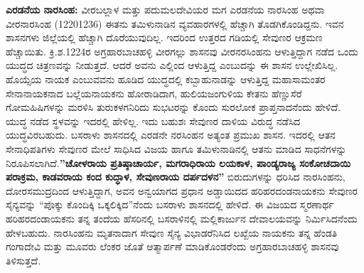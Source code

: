 \textbf{ಎರಡನೆಯ ನಾರಸಿಂಹ:} ವೀರಬಲ್ಲಾಳ ಮತ್ತು ಪದುಮಲದೇವಿಯರ ಮಗ ಎರಡನೆಯ ನಾರಸಿಂಹ ಅಥವಾ ವೀರನಾರಸಿಂಹ (1220\enginline{-}1236) ಈತನು ತಮಿಳುನಾಡಿನ ವ್ಯವಹಾರಗಳಲ್ಲಿ ಹೆಚ್ಚಾಗಿ ತೊಡಗಿಕೊಂಡಿದ್ದನು. ಇವನ ಶಾಸನಗಳು ಜಿಲ್ಲೆಯಲ್ಲಿ ಹೆಚ್ಚಾಗಿ ದೊರೆಯುವುದಿಲ್ಲ. ಇದರಿಂದ ಉತ್ತರದ ಗಡಿಯಲ್ಲಿ ಸೇವುಣರ ಆಕ್ರಮಣ ಹೆಚ್ಚಾಯಿತು. ಕ್ರಿ.ಶ.1224ರ ಅಗ್ರಹಾರಬಾಚಹಳ್ಳಿ ವೀರಗಲ್ಲು ಶಾಸನವು ವೀರನರಸಿಂಹನು ಆಳುತ್ತಿದ್ದಾಗ ನಡೆದ ಒಂದು ಯುದ್ಧದ ಚಿತ್ರಣವನ್ನು ನೀಡುತ್ತದೆ. ಆದರೆ ಅವನು ಎಲ್ಲಿಂದ ಆಳುತ್ತಿದ್ದ ಎಂಬುದನ್ನು ಈ ಶಾಸನ ಉಲ್ಲೇಖಿಸಿಲ್ಲ. ಹೊಯ್ಸೆಯ ನಾಯಕ ಎಂಬು\-ವವನು ಹೂಡಿದ ಯುದ್ಧದಲ್ಲಿ ಕಬ್ಬಾಹುನಾಡನ್ನು ಆಳುತ್ತಿದ್ದ ಮಹಾಸಾಮಂತರ ಸೇನಾನಾಯಕನಾದ ಬಲ್ಲೆಯನಾಯಕನು ಹೋರಾಡಿದಾಗ, ಹುಲಿಯಜಂಗುಳಿಯ ಕೇತನು ಹೆಣ್ಣುಸೆರೆ ಗೋಮಹಿಷಿಗಳನ್ನು ಮರಳಿಸಿ ತುರುಕಳಗನಿರಿದು ಸುಭಟರನ್ನು ಕೊಂದು ಸುರಲೋಕ ಪ್ರಾಪ್ತನಾದನೆಂದು ಹೇಳಿದೆ. ಯುದ್ಧ ನಡೆದ ಸ್ಥಳವನ್ನು ಇದರಲ್ಲಿ ಹೇಳಿಲ್ಲ. ಇದು ಬಹುಶಃ ಸೇವುಣರ ದಾಳಿಯ ವಿರುದ್ಧ ನಡೆಸಿದ ಯುದ್ಧವಿರಬಹುದು. ಬಸರಾಳು ಶಾಸನದಲ್ಲಿ ಎರಡನೇ ನರಸಿಂಹನ ಅತ್ಯಂತ ಪ್ರಮುಖ ಶಾಸನ. ಇದರಲ್ಲಿ ಆತನ ಸೇನಾಧಿಪತಿಗಳು ಸೇವುಣರ ಮೇಲೆ ಸಾಧಿಸಿದ ವಿಜಯ ಹಾಗೂ ತಮಿಳುನಾಡಿನಲ್ಲಿ ಆತನು ಮಾಡಿದ ಸಾಧನೆಗಳನ್ನು ನಿರೂಪಿಸಲಾಗಿದೆ.\textbf{''ಚೋಳರಾಯ ಪ್ರತಿಷ್ಠಾಚಾರ್ಯ, ಮಗರಾಧಿರಾಯ ಲಯಕಾಳ, ಪಾಂಡ್ಯರಾಜ್ಯ ಸಂಕೋಚದಾಯಿ ಪರಾಕ್ರಮ, ಕಾಡವರಾಯ ಕಂದ ಕುದ್ಧಾಳ, ಸೇವುಣರಾಯ ದರ್ಪದಳನ''} ಬಿರುದುಗಳನ್ನು ಧರಿಸಿದ ನಾರಸಿಂಹನು, ದೋರಸಮುದ್ರದಿಂದ ಆಳುತ್ತಿದ್ದಾಗ, ಅವನ ಅನ್ವಯಾಗದ ಪ್ರಧಾನ ಅಡ್ಡಾಯಿದದ ಹರಿಹರದಂಡನಾಯಕನು ಸೇವುಣರ ಸೈನ್ಯವನ್ನು “ಪೊಕ್ಕು ಕೊಂದಿಕ್ಕಿ ಒಕ್ಕಲಿಕ್ಕಿದ”ನೆಂದು ಬಸರಾಳು ಶಾಸನದಲ್ಲಿ ಹೇಳಿದೆ. ಈ ವಿಜಯದ ಸ್ಮರಣಾರ್ಥ ಹರಿಹರದಂಡಾಯಕನು ತನ್ನ ತಂದೆಯ ಹೆಸರಿನಲ್ಲಿ ಬಸರಾಳಿನಲ್ಲಿ ಮಲ್ಲಿಕಾರ್ಜುನ ದೇವಾಲಯವನ್ನು ನಿರ್ಮಿಸಿದನೆಂದು ಹೇಳಬಹುದು. ನಾರಸಿಂಹನು ಮೃತನಾದಾಗ ಸೇವುಣ ಸೈನ್ಯ ವಿಭಾಡರೆನಿಸಿದ ಲಖ್ಖೆಯ ನಾಯಕನು ತನ್ನ ಹೆಂಡತಿ ಗಂಗಾದೇವಿ ಮತ್ತು ಮೂವರು ಲೆಂಕರ ಜೊತೆ ಆತ್ಮಾರ್ಪಣೆ ಮಾಡಿಕೊಂಡರೆಂದು ಅಗ್ರಹಾರಬಾಚಹಳ್ಳಿ ಶಾಸನವು ತಿಳಿಸುತ್ತದೆ.

